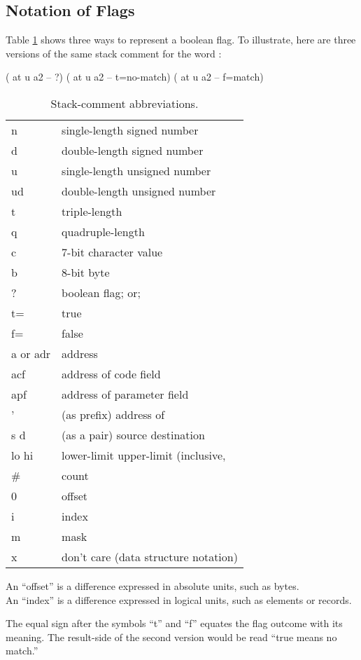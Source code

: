 \subsection{Notation of Flags}

Table \ref{tab-5-2} shows three ways to represent a boolean flag.  To
illustrate, here are three versions of the same stack comment for the
word :
\begin{Code}
( at u a2 -- ?)
( at u a2 -- t=no-match)
( at u a2 -- f=match)
\end{Code}

\begin{table}[hhhh]
\caption{Stack-comment abbreviations.}
\label{tab-5-2}
\vspace{1ex}
\blackline{1ex}
\begin{tabular}{@{\hspace{2.5em}}ll}
n             &  single-length signed number \\
d             &  double-length signed number \\
u             &  single-length unsigned number \\
ud            &  double-length unsigned number \\
t             &  triple-length \\
q             &  quadruple-length \\
c             &  7-bit character value \\
b             &  8-bit byte \\
?             &  boolean flag; or; \\
\quad t=         &  true \\
\quad f=         &  false \\
a or adr      &  address \\
acf           &  address of code field \\
apf           &  address of parameter field \\
'             &  (as prefix) address of \\
s d           &  (as a pair) source destination \\
lo hi         &  lower-limit upper-limit (inclusive, \\
\#            &   count \\
0             &  offset \\
i             &  index \\
m             &  mask \\
x             &  don't care (data structure notation) \\
\end{tabular}
\smallskip

An ``offset'' is a difference expressed in absolute units, such as bytes.\\
An ``index'' is a difference expressed in logical units, such as
elements or records.
\vspace{0ex}
\blackline{0ex}
\end{table}
The equal sign after the symbols ``t'' and ``f'' equates the flag
outcome with its meaning.  The result-side of the second version would
be read ``true means no match.''

